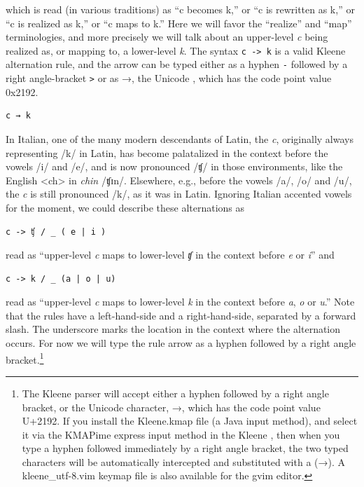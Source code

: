 \noindent
which is read (in various traditions) as ``c becomes k,'' or ``c is rewritten as k,'' or ``c is realized
as k,'' or ``c
maps to k.''  Here we will favor the ``realize'' and ``map'' terminologies, and more precisely we will
talk about an upper-level \emph{c} being realized as, or mapping to, a lower-level \emph{k}.  The syntax
\texttt{c -> k} is a valid Kleene alternation rule, and the arrow can be typed either as a hyphen \texttt{-} followed
by a right angle-bracket \texttt{>} or as →, the Unicode
,
which has the code point value 0x2192.

\begin{Verbatim}
c → k
\end{Verbatim}


In Italian, one of the many modern descendants of Latin, the \emph{c},
originally always representing /k/ in Latin, has become palatalized in the context before the vowels /i/ and
/e/, and is now pronounced /ʧ/ in those environments, like the English
<ch> in \emph{chin} /ʧɪn/.  Elsewhere, e.g.,
before the vowels /a/, /o/ and /u/, the \emph{c} is still pronounced /k/,
as it was in Latin.  Ignoring Italian accented vowels for the moment, we could
describe these alternations as 

\begin{Verbatim}
c -> ʧ / _ ( e | i )
\end{Verbatim}

\noindent
read as ``upper-level \emph{c} maps to lower-level \emph{ʧ} in the context before \emph{e} or \emph{i}'' and

\begin{Verbatim}
c -> k / _ (a | o | u)
\end{Verbatim}

\noindent
read as ``upper-level \emph{c} maps to lower-level \emph{k} in the context before \emph{a}, \emph{o} or \emph{u}.''
Note that the rules have a left-hand-side and a right-hand-side, separated by a forward slash.  The underscore marks
the location in the context where the alternation occurs.  For now we
will type the rule arrow as a hyphen followed by a
right angle bracket.\footnote{The Kleene parser will accept either a hyphen
followed by a right angle bracket, or the Unicode  character, →, which has the code point value U+2192.  If you
install the Kleene.kmap file (a Java input method), and select
it via the KMAPime express input method in the Kleene , then when you type a hyphen followed immediately by a
right angle bracket, the two typed characters will be automatically
intercepted and substituted with a  (→).  A
kleene\_utf-8.vim keymap file is also available for the gvim editor.}

